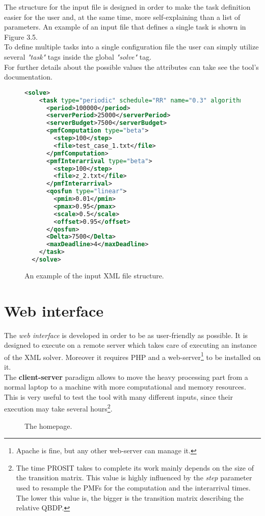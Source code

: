 The structure for the input file is designed in order to make the task definition easier for the user and, at the same time, more self-explaining than a list of parameters. An example of an input file that defines a single task is shown in Figure 3.5.\\
To define multiple tasks into a single configuration file the user can simply utilize several \emph{"task"} tags inside the global \emph{"solve"} tag.\\ 
For further details about the possible values the attributes can take see the tool's documentation.  
\begin{figure}[H]
\begin{lstlisting}[frame=bt, language=XML, numbers=none]
  <solve>
    <task type="periodic" schedule="RR" name="0.3" algorithm="cyclic">
      <period>100000</period>
      <serverPeriod>25000</serverPeriod>
      <serverBudget>7500</serverBudget>
      <pmfComputation type="beta">
        <step>100</step>
        <file>test_case_1.txt</file>
      </pmfComputation>
      <pmfInterarrival type="beta">
        <step>100</step>
        <file>z_2.txt</file>
      </pmfInterarrival>
      <qosfun type="linear">
        <pmin>0.01</pmin>
        <pmax>0.95</pmax>
        <scale>0.5</scale>
        <offset>0.95</offset>
      </qosfun>
      <Delta>7500</Delta>
      <maxDeadline>4</maxDeadline>
    </task>
  </solve>
\end{lstlisting}
\caption{An example of the input XML file structure.}
\end{figure}

\section{Web interface}
The \emph{web interface} is developed in order to be as user-friendly as possible. It is designed to execute on a remote server which takes care of executing an instance of the XML solver. Moreover it requires PHP and a web-server\footnote{Apache is fine, but any other web-server can manage it.} to be installed on it.\\
The \textbf{client-server} paradigm allows to move the heavy processing part from a normal laptop to a machine with more computational and memory resources. This is very useful to test the tool with many different inputs, since their execution may take several hours\footnote{The time PROSIT takes to complete its work mainly depends on the size of the transition matrix. This value is highly influenced by the \emph{step} parameter used to resample the PMFs for the computation and the interarrival times. The lower this value is, the bigger is the transition matrix describing the relative QBDP.}.
\begin{figure}[H]
  \caption{The homepage.}
  \label{index}
\end{figure}

